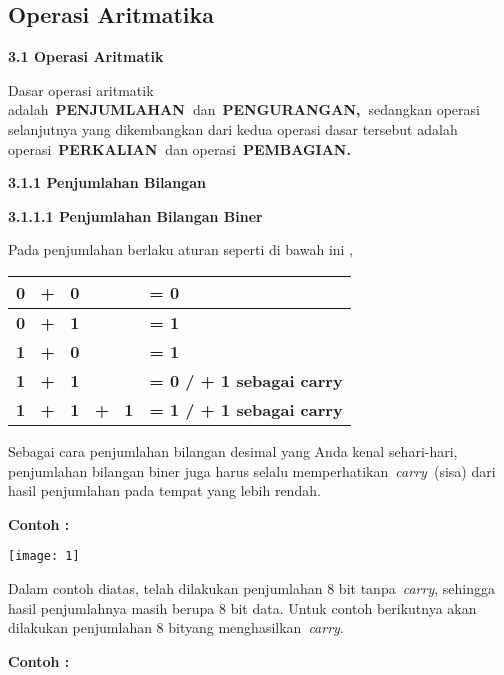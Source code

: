 \documentclass[11pt,fleqn]{book} %
\begin{document}
\begin{myEnumerate}
\begin{itemize}
\noindent 

\noindent

\section{Operasi Aritmatika}

\noindent \textbf{3.1 Operasi Aritmatik}

Dasar operasi aritmatik adalah~\textbf{PENJUMLAHAN~}dan~\textbf{PENGURANGAN,~}sedangkan operasi selanjutnya yang dikembangkan dari kedua operasi dasar tersebut adalah operasi~\textbf{PERKALIAN~}dan operasi~\textbf{PEMBAGIAN.}

\noindent \textbf{3.1.1 Penjumlahan Bilangan}

\noindent \textbf{3.1.1.1 Penjumlahan Bilangan Biner}

Pada penjumlahan berlaku aturan seperti di bawah ini ,

\begin{center}
\begin{tabular}{|p{0.9in}|p{1.3in}|} \hline 
\textbf{0~ +~ 0} & \textbf{= 0} \\ \hline 
\textbf{0~ +~ 1} & \textbf{= 1} \\ \hline 
\textbf{1~ +~ 0} & \textbf{= 1} \\ \hline 
\textbf{1~ +~ 1} & \textbf{= 0 / + 1 sebagai carry} \\ \hline 
\textbf{1~ +~ 1~ +~ 1} & \textbf{= 1 / + 1 sebagai carry} \\ \hline 
\end{tabular}
\end{center}

Sebagai cara penjumlahan bilangan desimal yang Anda kenal sehari-hari, penjumlahan bilangan biner juga harus selalu memperhatikan~\textit{carry~}(sisa) dari hasil penjumlahan pada tempat yang lebih rendah.

\noindent \textbf{Contoh :}

\begin{center}
\noindent \texttt{[image: 1]}
\end{center}
\noindent 

\noindent Dalam contoh diatas, telah dilakukan penjumlahan 8 bit tanpa~\textit{carry}, sehingga hasil penjumlahnya masih berupa 8 bit data. Untuk contoh berikutnya akan dilakukan penjumlahan 8 bityang menghasilkan~\textit{carry}.

\noindent \textbf{Contoh :}


\end{itemize}
\end{myEnumerate}
\end{document}
